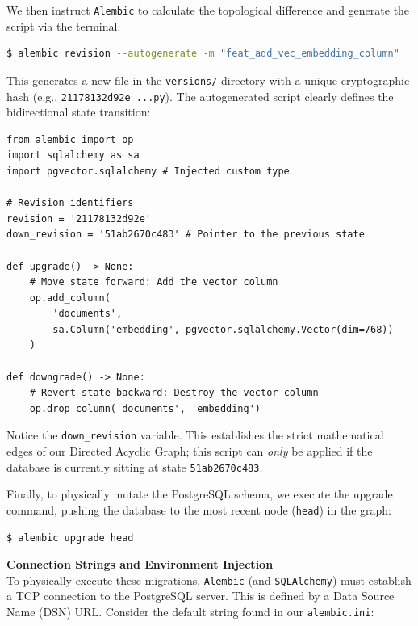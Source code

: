We then instruct \texttt{Alembic} to calculate the topological difference and generate the script via the terminal:

\begin{lstlisting}[language=bash, caption={Generating the Migration}]
$ alembic revision --autogenerate -m "feat_add_vec_embedding_column"
\end{lstlisting}

This generates a new file in the \texttt{versions/} directory with a unique cryptographic hash (e.g., \texttt{21178132d92e\_...py}). The autogenerated script clearly defines the bidirectional state transition:

\begin{lstlisting}[caption={The Deterministic State Transition (Simplified)}]
from alembic import op
import sqlalchemy as sa
import pgvector.sqlalchemy # Injected custom type

# Revision identifiers
revision = '21178132d92e'
down_revision = '51ab2670c483' # Pointer to the previous state

def upgrade() -> None:
    # Move state forward: Add the vector column
    op.add_column(
        'documents',
        sa.Column('embedding', pgvector.sqlalchemy.Vector(dim=768))
    )

def downgrade() -> None:
    # Revert state backward: Destroy the vector column
    op.drop_column('documents', 'embedding')
\end{lstlisting}

Notice the \texttt{down\_revision} variable. This establishes the strict mathematical edges of our Directed Acyclic Graph; this script can \textit{only} be applied if the database is currently sitting at state \texttt{51ab2670c483}.

Finally, to physically mutate the PostgreSQL schema, we execute the upgrade command, pushing the database to the most recent node (\texttt{head}) in the graph:

\begin{lstlisting}[language=bash, caption={Applying the State Transition}]
$ alembic upgrade head
\end{lstlisting}

\textbf{Connection Strings and Environment Injection} \\
To physically execute these migrations, \texttt{Alembic} (and \texttt{SQLAlchemy}) must establish a TCP connection to the PostgreSQL server. This is defined by a Data Source Name (DSN) URL. Consider the default string found in our \texttt{alembic.ini}:

